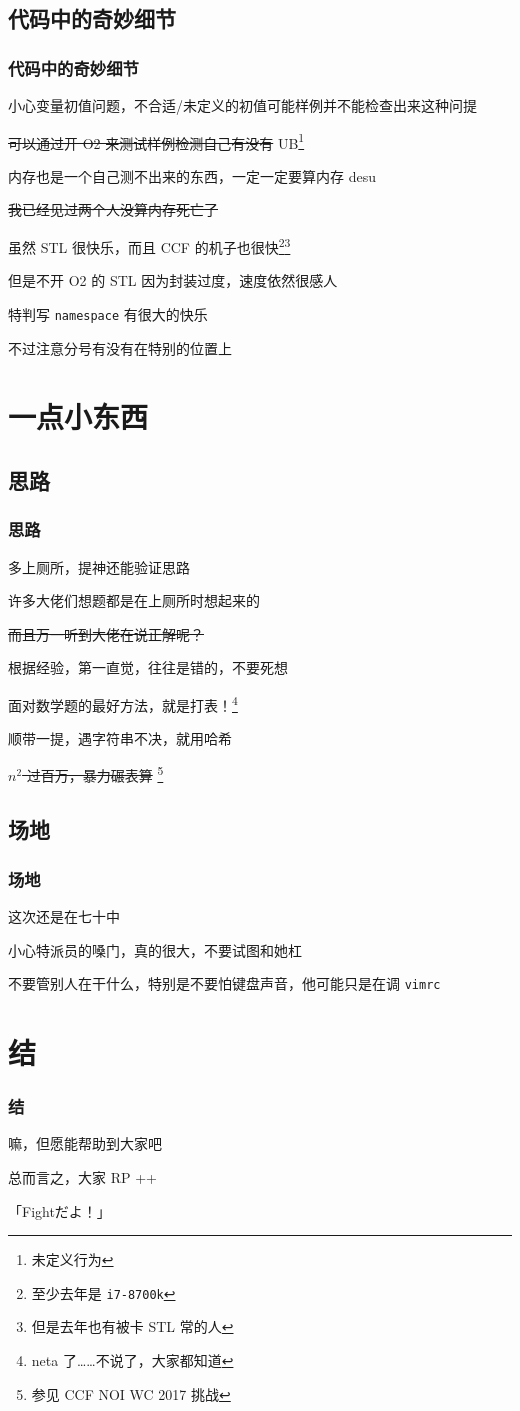 \documentclass[10pt]{beamer}
\begin{document}
	\subsection{代码中的奇妙细节}
	\begin{frame}
		\frametitle{代码中的奇妙细节}
		小心变量初值问题，不合适/未定义的初值可能样例并不能检查出来这种问提

		\sout{可以通过开 O2 来测试样例检测自己有没有} UB\footnote{未定义行为}
		
		\pause

		内存也是一个自己测不出来的东西，一定一定要算内存 desu

		\sout{我已经见过两个人没算内存死亡了}

		\pause

		虽然 STL 很快乐，而且 CCF 的机子也很快\footnote{至少去年是 \texttt{i7-8700k}}\footnote{但是去年也有被卡 STL 常的人}

		但是不开 O2 的 STL 因为封装过度，速度依然很感人

		\pause

		特判写 \texttt{namespace} 有很大的快乐

		不过注意分号有没有在特别的位置上
	\end{frame}

	\section{一点小东西}
	\subsection{思路}
	\begin{frame}
		\frametitle{思路}
		多上厕所，提神还能验证思路

		许多大佬们想题都是在上厕所时想起来的
		
		\sout{而且万一听到大佬在说正解呢？}

		\pause

		根据经验，第一直觉，往往是错的，不要死想

		\pause

		面对数学题的最好方法，就是打表！\footnote{neta 了……不说了，大家都知道}

		顺带一提，遇字符串不决，就用哈希

		\pause

		\sout{ $n^2$ 过百万，暴力碾表算} \footnote{参见 CCF NOI WC 2017 挑战}
	\end{frame}

	\subsection{场地}
	\begin{frame}
		\frametitle{场地}
		这次还是在七十中

		小心特派员的嗓门，真的很大，不要试图和她杠

		不要管别人在干什么，特别是不要怕键盘声音，他可能只是在调 \texttt{vimrc}
	\end{frame}

	\section{结}
	\begin{frame}
		\frametitle{结}
		嘛，但愿能帮助到大家吧

		总而言之，大家 RP ++

		「Fightだよ！」
	\end{frame}
\end{document}
